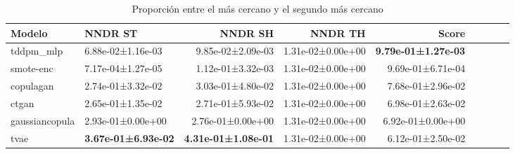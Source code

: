 \begin{table}[H]
\centering
\fontsize{10}{14}\selectfont
\caption{Proporción entre el más cercano y el segundo más cercano}
\label{table-dcr-economicos-a}
\begin{tabular}{|l|l|r|r|r|r|r|r|r|}
\hline
\rowcolor[gray]{0.8}
Modelo & NNDR ST & NNDR SH & NNDR TH & \textbf{Score} \\
\hline tddpm\_mlp & 6.88e-02±1.16e-03 & \cellcolor[rgb]{0.9, 0.54, 0.52} 9.85e-02±2.09e-03 & 1.31e-02±0.00e+00 & \bfseries 9.79e-01±1.27e-03 \\
\hline smote-enc & \cellcolor[rgb]{0.9, 0.54, 0.52} 7.17e-04±1.27e-05 & 1.12e-01±3.32e-03 & 1.31e-02±0.00e+00 & 9.69e-01±6.71e-04 \\
\hline copulagan & 2.74e-01±3.32e-02 & 3.03e-01±4.80e-02 & 1.31e-02±0.00e+00 & 7.68e-01±2.96e-02 \\
\hline ctgan & 2.65e-01±1.35e-02 & 2.71e-01±5.93e-02 & 1.31e-02±0.00e+00 & 6.98e-01±2.63e-02 \\
\hline gaussiancopula & 2.93e-01±0.00e+00 & 2.76e-01±0.00e+00 & 1.31e-02±0.00e+00 & 6.92e-01±0.00e+00 \\
\hline tvae & \bfseries 3.67e-01±6.93e-02 & \bfseries 4.31e-01±1.08e-01 & 1.31e-02±0.00e+00 & \cellcolor[rgb]{0.9, 0.54, 0.52} 6.12e-01±2.50e-02 \\
\hline
\end{tabular}
\end{table}
